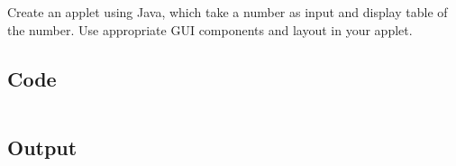 \documentclass[../main.tex]{subfiles}
\begin{document}
Create an applet using Java, which take a number as input and display table
of the number. Use appropriate GUI components and layout in your applet.

\subsection{Code}
\inputminted[frame=lines, breaklines, breakanywhere, numberblanklines=false]{java}{./programs/prog14/Tables.java}

\subsection{Output}
\end{document}
